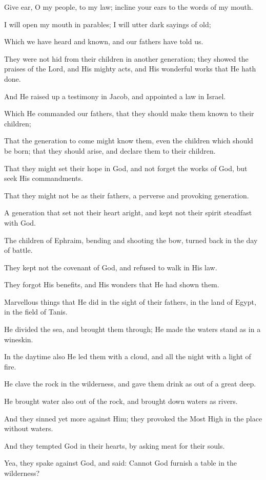 Give ear, O my people, to my law; incline your ears to the words of my mouth.

I will open my mouth in parables; I will utter dark sayings of old;

Which we have heard and known, and our fathers have told us.

They were not hid from their children in another generation; they showed the praises of the Lord, and His mighty acts, and His wonderful works that He hath done.

And He raised up a testimony in Jacob, and appointed a law in Israel.

Which He commanded our fathers, that they should make them known to their children;

That the generation to come might know them, even the children which should be born; that they should arise, and declare them to their children.

That they might set their hope in God, and not forget the works of God, but seek His commandments.

That they might not be as their fathers, a perverse and provoking generation.

A generation that set not their heart aright, and kept not their spirit steadfast with God.

The children of Ephraim, bending and shooting the bow, turned back in the day of battle.

They kept not the covenant of God, and refused to walk in His law.

They forgot His benefits, and His wonders that He had shown them.

Marvellous things that He did in the sight of their fathers, in the land of Egypt, in the field of Tanis.

He divided the sea, and brought them through; He made the waters stand as in a wineskin.

In the daytime also He led them with a cloud, and all the night with a light of fire.

He clave the rock in the wilderness, and gave them drink as out of a great deep.

He brought water also out of the rock, and brought down waters as rivers.

And they sinned yet more against Him; they provoked the Most High in the place without waters.

And they tempted God in their hearts, by asking meat for their souls.

Yea, they spake against God, and said: Cannot God furnish a table in the wilderness?

